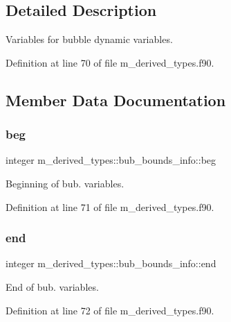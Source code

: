 \subsection{Detailed Description}
Variables for bubble dynamic variables. 

Definition at line 70 of file m\+\_\+derived\+\_\+types.\+f90.



\subsection{Member Data Documentation}
\mbox{\label{structm__derived__types_1_1bub__bounds__info_af1cd7c7f30de05a0f9ee49f5d23ef354}} 
\subsubsection{\texorpdfstring{beg}{beg}}
{\footnotesize\ttfamily integer m\+\_\+derived\+\_\+types\+::bub\+\_\+bounds\+\_\+info\+::beg}



Beginning of bub. variables. 



Definition at line 71 of file m\+\_\+derived\+\_\+types.\+f90.

\mbox{\label{structm__derived__types_1_1bub__bounds__info_a01730fa85d33e3174561ad5182d2e052}} 
\subsubsection{\texorpdfstring{end}{end}}
{\footnotesize\ttfamily integer m\+\_\+derived\+\_\+types\+::bub\+\_\+bounds\+\_\+info\+::end}



End of bub. variables. 



Definition at line 72 of file m\+\_\+derived\+\_\+types.\+f90.

